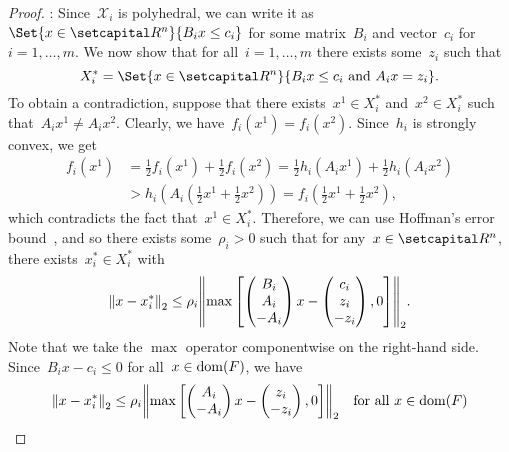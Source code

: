 \documentclass[../main]{subfiles}
\begin{document}
\begin{proof}
    :
    Since~$\mathcal{X}_i$ is polyhedral, we can write it as~$\Set{x \in \setR^n}{B_i x \le c_i}$ for some matrix~$B_i$ and vector~$c_i$ for~$i = 1, \dots, m$.
    We now show that for all~$i = 1, \dots, m$ there exists some~$z_i$ such that
    \begin{equation}
        X_i^* = \Set{x \in \setR^n}{B_i x \le c_i \text{ and } A_i x = z_i}
    .\end{equation}
    To obtain a contradiction, suppose that there exists~$x^1 \in X_i^*$ and~$x^2 \in X_i^*$ such that~$A_i x^1 \neq A_i x^2$.
    Clearly, we have~$f_i(x^1) = f_i(x^2)$.
    Since~$h_i$ is strongly convex, we get
    \begin{align}
        f_i(x^1) &= \frac{1}{2} f_i(x^1) + \frac{1}{2} f_i(x^2) = \frac{1}{2} h_i(A_i x^1) + \frac{1}{2} h_i(A_i x^2) \\
                 &> h_i\left( A_i \left( \frac{1}{2} x^1 + \frac{1}{2} x^2 \right) \right) = f_i\left( \frac{1}{2} x^1 + \frac{1}{2} x^2 \right)  
    ,\end{align}
    which contradicts the fact that~$x^1 \in X_i^*$.
    Therefore, we can use Hoffman's error bound~\cite{Hoffman1952}, and so there exists some~$\rho_i > 0$ such that for any~$x \in \setR^n$, there exists~$x_i^* \in X_i^*$ with
    \begin{equation}
        \norm*{x - x_i^*}_2 \le \rho_i \norm*{\max \left[ \begin{pmatrix} B_i \\ A_i \\ - A_i \end{pmatrix} x - \begin{pmatrix} c_i \\ z_i \\ - z_i \end{pmatrix}, 0 \right] }_2
    .\end{equation}
    Note that we take the $\max$ operator componentwise on the right-hand side.
    Since~$B_i x - c_i \le 0$ for all~$x \in \operatorname{dom}(F)$, we have
    \begin{equation}
        \norm*{x - x_i^*}_2 \le \rho_i \norm*{\max \left[ \begin{pmatrix} A_i \\ - A_i \end{pmatrix} x - \begin{pmatrix} z_i \\ - z_i \end{pmatrix} , 0 \right] }_2 \forallcondition{x \in \dom(F)}

\end{equation}
\end{proof}
\end{document}
